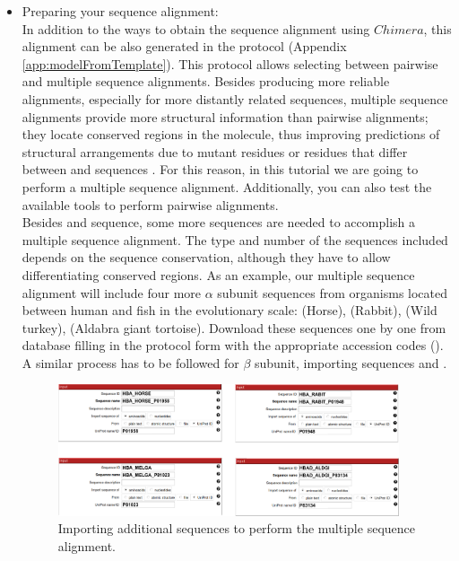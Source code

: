  \begin{itemize}
 \item Preparing your sequence alignment:\\
In addition to the ways to obtain the  sequence alignment using $Chimera$, this alignment can be also generated in the \scipion protocol  (Appendix \ref{app:modelFromTemplate}). This protocol allows selecting between pairwise and multiple sequence alignments. Besides producing more reliable alignments, especially for more distantly related sequences, multiple sequence alignments provide more structural information than pairwise alignments; they locate conserved regions in the molecule, thus improving predictions of structural arrangements due to mutant residues or residues that differ between  and  sequences \citep{pearson2013}. For this reason, in this tutorial we are going to perform a multiple sequence alignment. Additionally, you can also test the available tools to perform pairwise alignments.\\
 
Besides  and  sequence, some more sequences are needed to accomplish a multiple sequence alignment. The type and number of the sequences included depends on the sequence conservation, although they have to allow differentiating conserved regions. As an example, our multiple sequence alignment will include four more  $\alpha$ subunit sequences from organisms located between human and fish in the evolutionary scale:  (Horse),  (Rabbit),  (Wild turkey),  (Aldabra giant tortoise). Download these sequences one by one from  database filling in the  protocol form with the appropriate accession codes (). A similar process has to be followed for  $\beta$ subunit, importing  sequences  and .

  \begin{figure}[H]
  \centering 
  \captionsetup{width=.7\linewidth} 
  \includegraphics[width=0.95\textwidth]{Images/Fig12.png}
  \caption{Importing additional sequences to perform the multiple sequence alignment.}
  \label{fig:multialignment_sequences}
  \end{figure}


\end{itemize}
